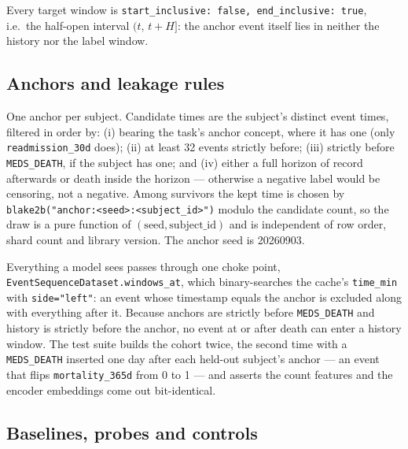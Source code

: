 \documentclass[11pt,a4paper]{article}
\newcommand{\code}[1]{\texttt{\small #1}}
\begin{document}
Every target window is \code{start\_inclusive: false, end\_inclusive: true},
i.e.\ the half-open interval $(t,\, t+H]$: the anchor event itself lies in
neither the history nor the label window.

\subsection{Anchors and leakage rules}

One anchor per subject. Candidate times are the subject's distinct event times,
filtered in order by: (i) bearing the task's anchor concept, where it has one
(only \code{readmission\_30d} does); (ii) at least 32 events strictly before;
(iii) strictly before \code{MEDS\_DEATH}, if the subject has one; and (iv)
either a full horizon of record afterwards or death inside the horizon ---
otherwise a negative label would be censoring, not a negative. Among survivors
the kept time is chosen by
\code{blake2b("anchor:\textless seed\textgreater:\textless subject\_id\textgreater")}
modulo the candidate count, so the draw is a pure function of $(\text{seed},
\text{subject\_id})$ and is independent of row order, shard count and library
version. The anchor seed is 20260903.

Everything a model sees passes through one choke point,
\code{EventSequenceDataset.windows\_at}, which binary-searches the cache's
\code{time\_min} with \code{side="left"}: an event whose timestamp equals the
anchor is excluded along with everything after it. Because anchors are strictly
before \code{MEDS\_DEATH} and history is strictly before the anchor, no event at
or after death can enter a history window. The test suite builds the cohort
twice, the second time with a \code{MEDS\_DEATH} inserted one day after each
held-out subject's anchor --- an event that flips \code{mortality\_365d} from 0
to 1 --- and asserts the count features and the encoder embeddings come out
bit-identical.

\subsection{Baselines, probes and controls}
\end{document}
